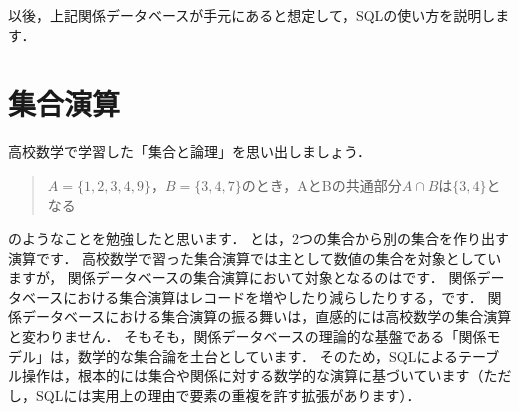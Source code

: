 \begin{table}[!htbp]
    \centering
    \caption{テーブル「注文」の内容．}
    \label{tab:order-table}
\end{table}

以後，上記関係データベースが手元にあると想定して，SQLの使い方を説明します．


\section{集合演算}
高校数学で学習した「集合と論理」を思い出しましょう．
\begin{quotation}
$A=\{1, 2, 3, 4, 9\}$，$B=\{3, 4, 7\}$のとき，AとBの共通部分$A \cap B$は$\{3, 4\}$となる
\end{quotation}
のようなことを勉強したと思います．
とは，2つの集合から別の集合を作り出す演算です．
高校数学で習った集合演算では主として数値の集合を対象としていますが，
関係データベースの集合演算において対象となるのはです．
関係データベースにおける集合演算はレコードを増やしたり減らしたりする，です．
関係データベースにおける集合演算の振る舞いは，直感的には高校数学の集合演算と変わりません．
そもそも，関係データベースの理論的な基盤である「関係モデル」は，数学的な集合論を土台としています．
そのため，SQLによるテーブル操作は，根本的には集合や関係に対する数学的な演算に基づいています（ただし，SQLには実用上の理由で要素の重複を許す拡張があります）．


